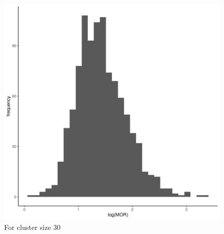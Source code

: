 \documentclass[
  letterpaper,
  DIV=11,
  numbers=noendperiod,
  titlepage]{scrartcl}
\begin{document}
\begin{figure}
\begin{minipage}[t]{0.50\linewidth}
{{\includegraphics{../../plots/two-lvl-ran-int/high-prev/hist_10_30_two_lvl_high_prev.png}

}

\caption{For cluster size 30}

}

\end{minipage}%
%
\begin{minipage}[t]{0.50\linewidth}

{\centering 

}
\end{minipage}
\end{figure}
\end{document}
